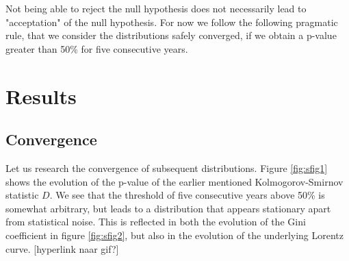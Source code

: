 Not being able to reject the null hypothesis does not necessarily lead to "acceptation" of the null hypothesis. For now we follow the following pragmatic rule, that we consider the distributions safely converged, if we obtain a p-value greater than 50\% for five consecutive years.

\section{Results}
\subsection{Convergence}
Let us research the convergence of subsequent distributions. Figure \ref{fig:sfig1} shows the evolution of the p-value of the earlier mentioned Kolmogorov-Smirnov statistic $D$. We see that the threshold of five consecutive years above 50\% is somewhat arbitrary, but leads to a distribution that appears stationary apart from statistical noise. This is reflected in both the evolution of the Gini coefficient in figure \ref{fig:sfig2}, but also in the evolution of the underlying Lorentz curve. [hyperlink naar gif?]

